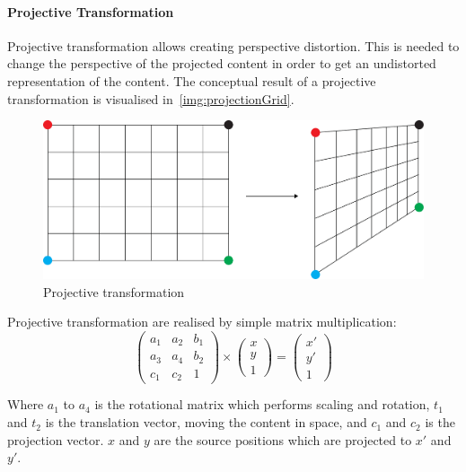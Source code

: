\paragraph{Projective Transformation}

Projective transformation allows creating perspective distortion. This is needed to change the perspective of the projected content in order to get an undistorted representation of the content. The conceptual result of a projective transformation is visualised in~\autoref{img:projectionGrid}.
\begin{figure}[htbp]
\begin{center}
	\includegraphics[width=\textwidth]{images/software/transformation/perspectiveTransformation.pdf}
\caption{Projective transformation}
\label{img:projectionGrid}
\end{center}
\end{figure}

Projective transformation are realised by simple matrix multiplication:
\begin{equation*}
\begin{pmatrix}
a_1 & a_2 & b_1  \\
a_3 & a_4 & b_2  \\
c_1 & c_2 & 1
\end{pmatrix}
\times
\begin{pmatrix}
x  \\
y  \\
1
\end{pmatrix}
=
\begin{pmatrix}
x'  \\
y'  \\
1
\end{pmatrix}
\end{equation*}

Where $a_1$ to $a_4$ is the rotational matrix which performs scaling and rotation, $t_1$ and $t_2$ is the translation vector, moving the content in space, and $c_1$ and $c_2$ is the projection vector. $x$ and $y$ are the source positions which are projected to $x'$ and $y'$.  

